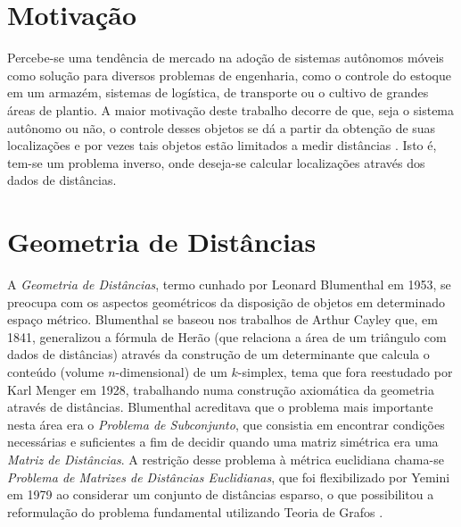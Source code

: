 \documentclass[a0,portrait]{a0poster}
\theoremstyle{plain}
\theoremstyle{definition}
\begin{document}

\begin{multicols}{2} %

\justify %


\section*{Motivação}
\vspace{-1cm}
Percebe-se uma tendência de mercado na adoção de sistemas autônomos móveis como solução para diversos problemas de engenharia, como o controle do estoque em um armazém, sistemas de logística, de transporte ou o cultivo de grandes áreas de plantio. A maior motivação deste trabalho decorre de que, seja o sistema autônomo ou não, o controle desses objetos se dá a partir da obtenção de suas localizações e por vezes tais objetos estão limitados a medir distâncias \cite{savvides2001dynamic}. Isto é, tem-se um problema inverso, onde deseja-se calcular localizações através dos dados de distâncias.
\vspace{-1cm}
\section*{Geometria de Distâncias}\vspace{-0.7cm}
A \textit{Geometria de Distâncias}, termo cunhado por Leonard Blumenthal em 1953, se preocupa com os aspectos geométricos da disposição de objetos em determinado espaço métrico. Blumenthal se baseou nos trabalhos de Arthur Cayley que, em 1841, generalizou a fórmula de Herão (que relaciona a área de um triângulo com dados de distâncias) através da construção de um determinante que calcula o conteúdo (volume $n$-dimensional) de um $k$-simplex, tema que fora reestudado por Karl Menger em 1928, trabalhando numa construção axiomática da geometria através de distâncias. Blumenthal acreditava que o problema mais importante nesta área era o \textit{Problema de Subconjunto}, que consistia em encontrar condições necessárias e suficientes a fim de decidir quando uma matriz simétrica era uma \textit{Matriz de Distâncias}. A restrição desse problema à métrica euclidiana chama-se \textit{Problema de Matrizes de Distâncias Euclidianas}, que foi flexibilizado por Yemini em 1979 ao considerar um conjunto de distâncias esparso, o que possibilitou a reformulação do problema fundamental utilizando Teoria de Grafos \cite{carlileGDandAplications}.


\end{multicols}
\end{document}
